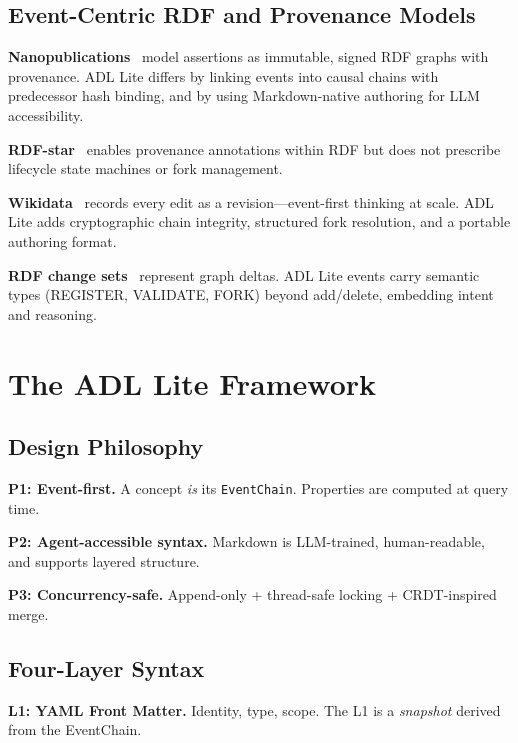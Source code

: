 \documentclass[11pt,a4paper]{article}
\theoremstyle{remark}
\begin{document}
\subsection{Event-Centric RDF and Provenance Models}

\textbf{Nanopublications}~\cite{groth2010nanopub} model assertions as immutable, signed RDF graphs with provenance. ADL Lite differs by linking events into causal chains with predecessor hash binding, and by using Markdown-native authoring for LLM accessibility.

\textbf{RDF-star}~\cite{hartig2024rdfstar} enables provenance annotations within RDF but does not prescribe lifecycle state machines or fork management.

\textbf{Wikidata}~\cite{vrandecic2014wikidata} records every edit as a revision---event-first thinking at scale. ADL Lite adds cryptographic chain integrity, structured fork resolution, and a portable authoring format.

\textbf{RDF change sets}~\cite{bernerslee2004delta} represent graph deltas. ADL Lite events carry semantic types (REGISTER, VALIDATE, FORK) beyond add/delete, embedding intent and reasoning.

\section{The ADL Lite Framework}
\label{sec:framework}

\subsection{Design Philosophy}

\textbf{P1: Event-first.} A concept \textit{is} its \texttt{EventChain}. Properties are computed at query time.

\textbf{P2: Agent-accessible syntax.} Markdown is LLM-trained, human-readable, and supports layered structure.

\textbf{P3: Concurrency-safe.} Append-only + thread-safe locking + CRDT-inspired merge.

\subsection{Four-Layer Syntax}

\textbf{L1: YAML Front Matter.} Identity, type, scope. The L1 is a \textit{snapshot} derived from the EventChain.
\end{document}
